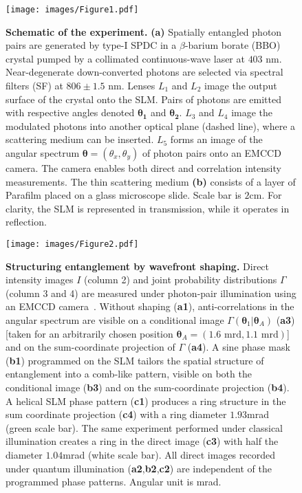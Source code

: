 \documentclass[%
 reprint,
 amsmath,amssymb,
 aps
]{revtex4-1}
\begin{document}
\begin{figure}
\centering
\texttt{[image: images/Figure1.pdf]}
\caption{\label{Figure1} \textbf{Schematic of the experiment.} \textbf{(a)} Spatially entangled photon pairs are generated by type-I SPDC in a $\beta$-barium borate (BBO) crystal pumped by a collimated continuous-wave laser at $403$ nm. Near-degenerate down-converted photons are selected via spectral filters (SF) at $806 \pm 1.5$ nm. Lenses $L_1$ and $L_2$ image the output surface of the crystal onto the SLM. Pairs of photons are emitted with respective angles denoted $\boldsymbol{\theta_1}$ and $\boldsymbol{\theta_2}$. $L_3$ and $L_4$ image the modulated photons into another optical plane (dashed line), where a scattering medium can be inserted. $L_5$ forms an image of the angular spectrum $\boldsymbol{\theta}=(\theta_x,\theta_y)$ of photon pairs onto an EMCCD camera. The camera enables both direct and correlation intensity measurements. The thin scattering medium  \textbf{(b)} consists of a layer of Parafilm placed on a glass microscope slide. Scale bar is $2$cm. For clarity, the SLM is represented in transmission, while it operates in reflection. }
\end{figure}

\begin{figure*}
\texttt{[image: images/Figure2.pdf]}
\caption{\label{Figure2} \textbf{Structuring entanglement by wavefront shaping.} Direct intensity images $I$ (column 2) and joint probability distributions $\Gamma$ (column 3 and 4) are measured under photon-pair illumination using an EMCCD camera~\cite{defienne_general_2018-1,reichert_massively_2018}. Without shaping (\textbf{a1}), anti-correlations in the angular spectrum are visible on a conditional image $\Gamma(\boldsymbol{\theta}_1|\boldsymbol{\theta}_A)$ (\textbf{a3}) [taken for an arbitrarily chosen position $\boldsymbol{\theta}_A = (1.6 \mbox{ mrd},1.1 \mbox{ mrd})$] and on the sum-coordinate projection of $\Gamma$ (\textbf{a4}). A sine phase mask (\textbf{b1}) programmed on the SLM tailors the spatial structure of entanglement into a comb-like pattern, visible on both the conditional image (\textbf{b3}) and on the sum-coordinate projection (\textbf{b4}). A helical SLM phase pattern (\textbf{c1}) produces a ring structure in the sum coordinate projection (\textbf{c4}) with a ring diameter $1.93$mrad (green scale bar). The same experiment performed under classical illumination creates a ring in the direct image (\textbf{c3}) with half the diameter $1.04$mrad (white scale bar). All direct images recorded under quantum illumination (\textbf{a2},\textbf{b2},\textbf{c2}) are independent of the programmed phase patterns. Angular unit is mrad. }
\end{figure*}
\end{document}
